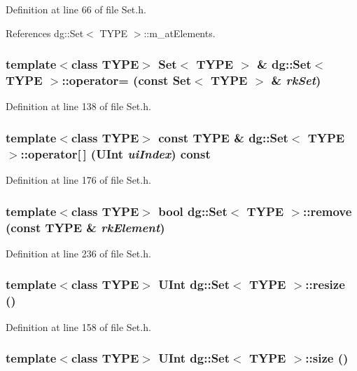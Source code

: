 Definition at line 66 of file Set.h.

References dg::Set$<$ TYPE $>$::m\_\-at\-Elements.
\subsubsection{\setlength{\rightskip}{0pt plus 5cm}template$<$class TYPE$>$ Set$<$ TYPE $>$ \& dg::Set$<$ TYPE $>$::operator= (const Set$<$ TYPE $>$ \& {\em rk\-Set})}\label{classdg_1_1Set_a3}




Definition at line 138 of file Set.h.
\subsubsection{\setlength{\rightskip}{0pt plus 5cm}template$<$class TYPE$>$ const TYPE \& dg::Set$<$ TYPE $>$::operator[$\,$] ({\bf UInt} {\em ui\-Index}) const\hspace{0.3cm}{\tt  [inline]}}\label{classdg_1_1Set_a8}




Definition at line 176 of file Set.h.
\subsubsection{\setlength{\rightskip}{0pt plus 5cm}template$<$class TYPE$>$ bool dg::Set$<$ TYPE $>$::remove (const TYPE \& {\em rk\-Element})}\label{classdg_1_1Set_a14}




Definition at line 236 of file Set.h.
\subsubsection{\setlength{\rightskip}{0pt plus 5cm}template$<$class TYPE$>$ {\bf UInt} dg::Set$<$ TYPE $>$::resize ()\hspace{0.3cm}{\tt  [inline]}}\label{classdg_1_1Set_a5}




Definition at line 158 of file Set.h.
\subsubsection{\setlength{\rightskip}{0pt plus 5cm}template$<$class TYPE$>$ {\bf UInt} dg::Set$<$ TYPE $>$::size ()\hspace{0.3cm}{\tt  [inline]}}\label{classdg_1_1Set_a6}




